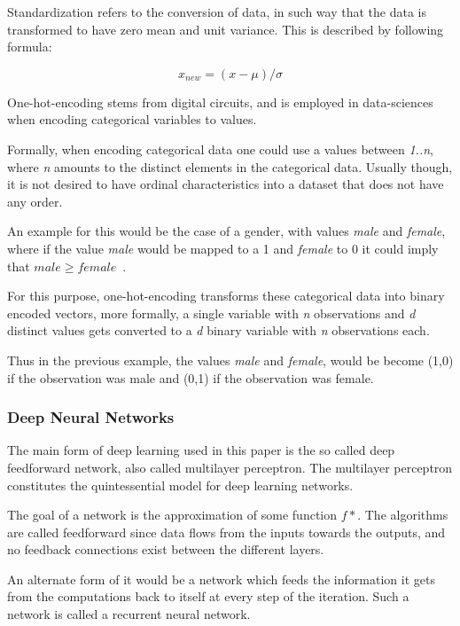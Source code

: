 \documentclass[12pt]{article}
\begin{document}
Standardization refers to the conversion of data, in such way that the data is transformed to have zero mean and unit variance. This is described by following formula:

\begin{equation}
x_{new} = (x - \mu) / \sigma
\end{equation}

One-hot-encoding stems from digital circuits, and is employed in data-sciences when encoding categorical variables to values. 

Formally, when encoding categorical data one could use a values between \textit{1..n}, where \textit{n} amounts to the distinct elements in the categorical data. Usually though, it is not desired to have ordinal characteristics into a dataset that does not have any order. 

An example for this would be the case of a gender, with values \textit{male} and \textit{female}, where if the value \textit{male} would be mapped to a 1 and \textit{female} to 0 it could imply that $male\ge{female}$~\citep{one_hot}.

For this purpose, one-hot-encoding transforms these categorical data into binary encoded vectors, more formally, a single variable with \textit{n} observations and \textit{d} distinct values gets converted to a \textit{d} binary variable with \textit{n} observations each. 

Thus in the previous example, the values \textit{male} and \textit{female}, would be become (1,0) if the observation was male and (0,1) if the observation was female.

\subsubsection{Deep Neural Networks}
\label{subsub:deep_nets}

The main form of deep learning used in this paper is the so called deep feedforward network, also called multilayer perceptron. The multilayer perceptron constitutes the quintessential model for deep learning networks. 

The goal of a network is the approximation of some function $f*$. The algorithms are called feedforward since data flows from the inputs towards the outputs, and no feedback connections exist between the different layers. 

An alternate form of it would be a network which feeds the information it gets from the computations back to itself at every step of the iteration. Such a network is called a recurrent neural network.
\end{document}
